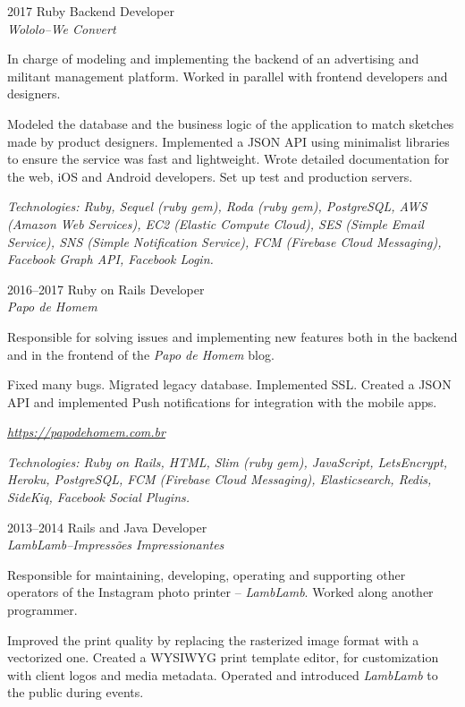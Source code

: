 \documentclass[a4paper]{simplecv}
\begin{document}
\begin{topic}
\item[2017] Ruby Backend Developer\\
	{\em\small Wololo--We Convert}

	In charge of modeling and implementing the backend of an advertising
	and militant management platform. Worked in parallel with frontend
	developers and designers.

	Modeled the database and the business logic of the application to match
	sketches made by product designers. Implemented a JSON API using
	minimalist libraries to ensure the service was fast and lightweight.
	Wrote detailed documentation for the web, iOS and Android developers.
	Set up test and production servers.

	{\em\scriptsize Technologies: Ruby, Sequel (ruby gem), Roda (ruby gem),
	PostgreSQL, AWS (Amazon Web Services), EC2 (Elastic Compute Cloud), SES
	(Simple Email Service), SNS (Simple Notification Service), FCM
	(Firebase Cloud Messaging), Facebook Graph API, Facebook Login.}

\item[2016--2017] Ruby on Rails Developer\\
	{\em\small Papo de Homem}

	Responsible for solving issues and implementing new features both in
	the backend and in the frontend of the \emph{Papo de Homem} blog.

	Fixed many bugs. Migrated legacy database. Implemented SSL. Created a
	JSON API and implemented Push notifications for integration with the
	mobile apps.

	{\em\scriptsize \url{https://papodehomem.com.br}}

	{\em\scriptsize Technologies: Ruby on Rails, HTML, Slim (ruby gem),
	JavaScript, LetsEncrypt, Heroku, PostgreSQL, FCM (Firebase Cloud
	Messaging), Elasticsearch, Redis, SideKiq, Facebook Social Plugins.}

\item[2013--2014] Rails and Java Developer\\
	{\em\small LambLamb--Impressões Impressionantes}

	Responsible for maintaining, developing, operating and supporting other
	operators of the Instagram photo printer -- \emph{LambLamb}. Worked
	along another programmer.

	Improved the print quality by replacing the rasterized image format
	with a vectorized one. Created a WYSIWYG print template editor, for
	customization with client logos and media metadata. Operated and
	introduced \emph{LambLamb} to the public during events.


\end{topic}
\end{document}
